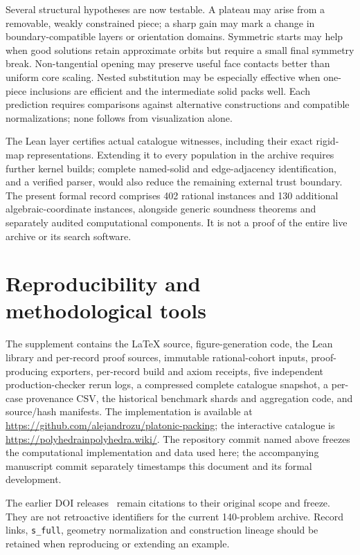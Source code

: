 \documentclass[11pt,a4paper]{article}
\newcommand{\code}[1]{\texttt{\nolinkurl{#1}}}
\newcommand{\leanRecords}{402}
\newcommand{\leanAlgebraicRecords}{130}
\begin{document}
Several structural hypotheses are now testable. A plateau may arise from a removable, weakly constrained piece; a sharp gain may mark a change in boundary-compatible layers or orientation domains. Symmetric starts may help when good solutions retain approximate orbits but require a small final symmetry break. Non-tangential opening may preserve useful face contacts better than uniform core scaling. Nested substitution may be especially effective when one-piece inclusions are efficient and the intermediate solid packs well. Each prediction requires comparisons against alternative constructions and compatible normalizations; none follows from visualization alone.

The Lean layer certifies actual catalogue witnesses, including their exact rigid-map representations. Extending it to every population in the archive requires further kernel builds; complete named-solid and edge-adjacency identification, and a verified parser, would also reduce the remaining external trust boundary. The present formal record comprises \leanRecords{} rational instances and \leanAlgebraicRecords{} additional algebraic-coordinate instances, alongside generic soundness theorems and separately audited computational components. It is not a proof of the entire live archive or its search software.

\section{Reproducibility and methodological tools}
The supplement contains the LaTeX source, figure-generation code, the Lean library and per-record proof sources, immutable rational-cohort inputs, proof-producing exporters, per-record build and axiom receipts, five independent production-checker rerun logs, a compressed complete catalogue snapshot, a per-case provenance CSV, the historical benchmark shards and aggregation code, and source/hash manifests. The implementation is available at \url{https://github.com/alejandrozu/platonic-packing}; the interactive catalogue is \url{https://polyhedrainpolyhedra.wiki/}. The repository commit named above freezes the computational implementation and data used here; the accompanying manuscript commit separately timestamps this document and its formal development.

The earlier DOI releases~\cite{zarzueloMethods,zarzueloPatterns,zarzueloData} remain citations to their original scope and freeze. They are not retroactive identifiers for the current 140-problem archive. Record links, \code{s_full}, geometry normalization and construction lineage should be retained when reproducing or extending an example.
\end{document}
